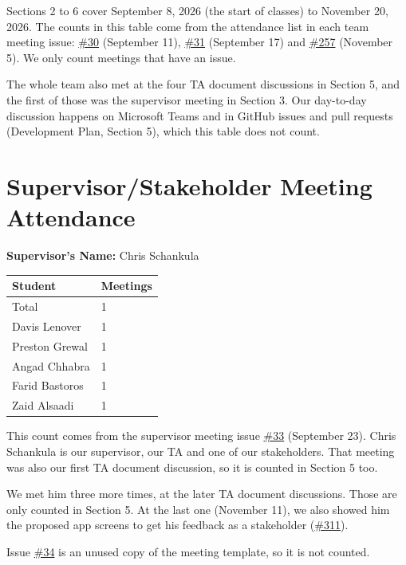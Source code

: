 \documentclass{article}
\begin{document}
Sections 2 to 6 cover September 8, 2026 (the start of classes) to November 20,
2026. The counts in this table come from the attendance list in each team
meeting issue:
\href{https://github.com/davislenover/BurnNEarn/issues/30}{\#30} (September 11), \href{https://github.com/davislenover/BurnNEarn/issues/31}{\#31} (September 17) and \href{https://github.com/davislenover/BurnNEarn/issues/257}{\#257}
(November 5). We only count meetings that have an issue.

The whole team also met at the four TA document discussions in Section 5, and
the first of those was the supervisor meeting in Section 3. Our day-to-day
discussion happens on Microsoft Teams and in GitHub issues and pull requests
(Development Plan, Section 5), which this table does not count.

\section{Supervisor/Stakeholder Meeting Attendance}

\noindent \textbf{Supervisor's Name: } Chris Schankula

\begin{table}[H]
\centering
\begin{tabular}{ll}
\toprule
\textbf{Student} & \textbf{Meetings}\\
\midrule
Total & 1\\
Davis Lenover & 1\\
Preston Grewal & 1\\
Angad Chhabra & 1\\
Farid Bastoros & 1\\
Zaid Alsaadi & 1\\
\bottomrule
\end{tabular}
\end{table}

This count comes from the supervisor meeting issue \href{https://github.com/davislenover/BurnNEarn/issues/33}{\#33} (September 23).
Chris Schankula is our supervisor, our TA and one of our stakeholders. That
meeting was also our first TA document discussion, so it is counted in
Section 5 too.

We met him three more times, at the later TA document discussions. Those are
only counted in Section 5. At the last one (November 11), we also showed him the
proposed app screens to get his feedback as a stakeholder (\href{https://github.com/davislenover/BurnNEarn/issues/311}{\#311}).

Issue \href{https://github.com/davislenover/BurnNEarn/issues/34}{\#34} is an unused copy of the meeting template, so it is not
counted.
\end{document}
